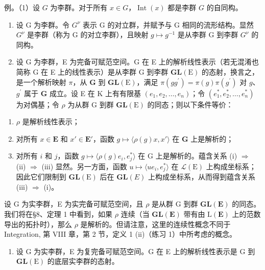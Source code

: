 例。（1）设 \(G\) 为李群。对于所有 \(x \in G\)，\(\operatorname{Int}(x)\) 都是李群 \(G\) 的自同构。

\begin{enumerate}
\def\labelenumi{(\arabic{enumi})}
\setcounter{enumi}{1}
\item
  设 G 为李群。令 \(G^{\nu}\) 表示 G 的对立群，并赋予与 G 相同的流形结构。显然 \(G^{\nu}\) 是李群（称为 G 的对立李群），且映射 \(g \mapsto g^{-1}\) 是从李群 G 到李群 \(G^{\nu}\) 的同构。
\item
  设 G 为李群，E 为完备可赋范空间。G 在 E 上的解析线性表示（若无混淆也简称 G 在 E 上的线性表示）是从李群 G 到李群 \(\mathbf{GL}(\mathrm{E})\) 的态射，换言之，是一个解析映射 \(\pi\)，从 \(\mathbf{G}\) 到 \(\mathbf{GL}(\mathrm{E})\)，满足 \(\pi (gg^{\prime}) = \pi (g)\pi (g^{\prime})\) 对 \(g\)、\(g^{\prime}\) 属于 \(\mathbf{G}\) 成立。设 E 在 K 上有有限基 \((e_1,e_2,\ldots ,e_n)\)；令 \((e_1^*,e_2^*,\dots ,e_n^*)\) 为对偶基；令 \(\rho\) 为从群 G 到群 \(\mathbf{GL}(\mathrm{E})\) 的同态；则以下条件等价：
\end{enumerate}

\begin{enumerate}
\def\labelenumi{(\roman{enumi})}
\item
  \(\rho\) 是解析线性表示；
\item
  对所有 \(x \in \mathbf{E}\) 和 \(x' \in \mathbf{E}'\)，函数 \(g \mapsto \langle \rho(g)x, x' \rangle\) 在 \(\mathbf{G}\) 上是解析的；
\item
  对所有 \(i\) 和 \(j\)，函数 \(g \mapsto \langle \rho(g)e_i, e_j^*\rangle\) 在 G 上是解析的。蕴含关系 (i) \(\Rightarrow\) (ii) \(\Rightarrow\) (iii) 显然。另一方面，函数 \(u \mapsto \langle ue_i, e_j^*\rangle\) 在 \(\mathcal{L}(\mathrm{E})\) 上构成坐标系；因此它们限制到 \(\mathbf{GL}(\mathrm{E})\) 后在 \(\mathbf{GL}(E)\) 上构成坐标系，从而得到蕴含关系 (iii) \(\Rightarrow\) (i)。
\end{enumerate}

设 G 为实李群，E 为实完备可赋范空间，且 \(\rho\) 是从群 G 到群 \(\mathbf{GL}(\mathbf{E})\) 的同态。我们将在§8、定理 1 中看到，如果 \(\rho\) 连续（当 \(\mathbf{GL}(\mathbf{E})\) 带有由 \(\mathrm{L}(\mathbf{E})\) 上的范数导出的拓扑时），那么 \(\rho\) 是解析的。但请注意，这里的连续性概念不同于 Integration, 第 VIII 章，第 2 节，定义 1 (ii)（练习 1）中所考虑的概念。

\begin{enumerate}
\def\labelenumi{(\arabic{enumi})}
\setcounter{enumi}{3}
\tightlist
\item
  设 G 为实李群，E 为复完备可赋范空间。G 在 E 上的解析线性表示是 G 到 \(\mathbf{GL}(\mathrm{E})\) 的底层实李群的态射。
\end{enumerate}

